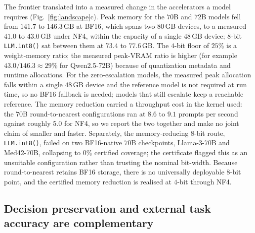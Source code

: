\documentclass[pdflatex,sn-mathphys-num]{sn-jnl}%
\theoremstyle{thmstyleone}%
\theoremstyle{thmstyletwo}%
\theoremstyle{thmstylethree}%
\begin{document}
The frontier translated into a measured change in the accelerators a model requires (Fig.~\ref{fig:landscape}c). Peak memory for
the $70$B and $72$B models fell from $141.7$ to $146.3$\,GB at BF16, which spans two $80$\,GB
devices, to a measured $41.0$ to $43.0$\,GB under NF4, within the capacity of a single $48$\,GB device; $8$-bit \texttt{LLM.int8()}
sat between them at $73.4$ to $77.6$\,GB. The $4$-bit floor of $25\%$ is a weight-memory ratio; the
measured peak-VRAM ratio is higher (for example $43.0/146.3\approx29\%$ for Qwen2.5-72B) because of
quantization metadata and runtime allocations. For the zero-escalation models, the measured peak allocation
falls within a single $48$\,GB device and the reference model is not
required at run time, so no BF16 fallback is needed; models that still escalate keep a reachable reference. The memory reduction carried a throughput cost in the kernel used: the $70$B
round-to-nearest configurations ran at $8.6$ to $9.1$ prompts per second against roughly $5.0$ for
NF4, so we report the two together and make no joint claim of smaller and faster. Separately, the
memory-reducing $8$-bit route, \texttt{LLM.int8()}, failed on two BF16-native $70$B checkpoints, Llama-3-70B and
Med42-70B, collapsing to $0\%$ certified coverage; the certificate flagged this as an unsuitable
configuration rather than trusting the nominal bit-width. Because round-to-nearest retains BF16 storage,
there is no universally deployable $8$-bit point, and the certified memory reduction is realised at $4$-bit through NF4.
 
\subsection*{Decision preservation and external task accuracy are complementary}
 
\end{document}
